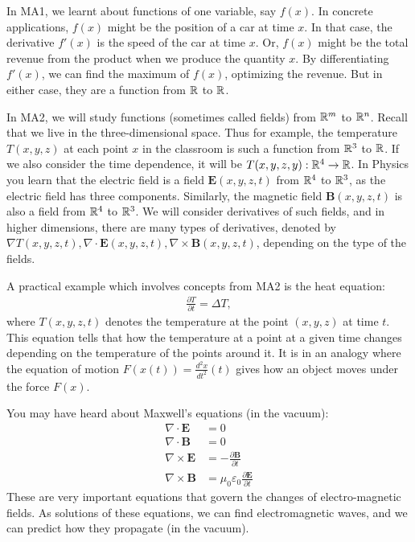 In MA1, we learnt about functions of one variable, say $f(x)$.
In concrete applications, $f(x)$ might be the position of a car at time $x$. In that case, the derivative $f'(x)$ is
the speed of the car at time $x$. Or, $f(x)$ might be the total revenue from the product when we produce the quantity $x$.
By differentiating $f'(x)$, we can find the maximum of $f(x)$, optimizing the revenue.
But in either case, they are a function from $\mathbb{R}$ to $\mathbb{R}$.

In MA2, we will study functions (sometimes called fields) from $\mathbb{R}^m$ to $\mathbb{R}^n$.
Recall that we live in the three-dimensional space. Thus for example,
the temperature $T(x,y,z)$ at each point $x$ in the classroom is such a function from $\mathbb{R}^3$ to $\mathbb{R}$.
If we also consider the time dependence, it will be $T(x,y,z,y): \mathbb{R}^4 \to \mathbb{R}$.
In Physics you learn that the electric field is a field $\mathbf{E}(x,y,z,t)$ from $\mathbb{R}^4$ to $\mathbb{R}^3$,
as the electric field has three components. Similarly, the magnetic field $\mathbf{B}(x,y,z,t)$ is also a field from $\mathbb{R}^4$ to $\mathbb{R}^3$.
We will consider derivatives of such fields, and in higher dimensions, there are many types of derivatives,
denoted by $\nabla T(x,y,z,t), \nabla \cdot \mathbf{E}(x,y,z,t), \nabla \times \mathbf{B}(x,y,z,t)$, depending on the type of the fields.

A practical example which involves concepts from MA2 is the heat equation:
\begin{align*}
 \frac{\partial T}{\partial t} = \Delta T,
\end{align*}
where $T(x,y,z,t)$ denotes the temperature at the point $(x,y,z)$ at time $t$.
This equation tells that how the temperature at a point at a given time changes depending on the temperature
of the points around it. It is in an analogy where the equation of motion $F(x(t)) = \frac{d^2 x}{dt^2}(t)$
gives how an object moves under the force $F(x)$.

You may have heard about Maxwell's equations (in the vacuum):
\begin{align*}
 \nabla \cdot \mathbf{E} &= 0 \\
 \nabla \cdot \mathbf{B} &= 0 \\
 \nabla \times \mathbf{E} &= -\frac{\partial \mathbf{B}}{\partial t} \\
 \nabla \times \mathbf{B} &= \mu_0\varepsilon_0 \frac{\partial \mathbf{E}}{\partial t}
\end{align*}
These are very important equations that govern the changes of electro-magnetic fields.
As solutions of these equations, we can find electromagnetic waves, and we can predict how they propagate (in the vacuum).



